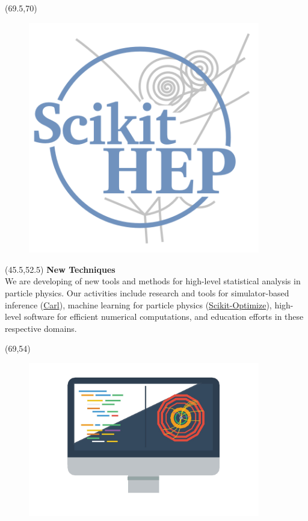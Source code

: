 \documentclass[final]{beamer}
\begin{document}
\begin{frame}{}
\begin{textblock}{12.0}(69.5,70)
\begin{figure}[tbph]
\centering
\includegraphics[width=0.9\textwidth]{images/scikit-hep-logo_800.png}
\end{figure}
\end{textblock}

\begin{textblock}{22.5}(45.5,52.5)
\textcolor{mybluelabel}{\bf New Techniques} \\
We are developing of new tools and methods for
high-level statistical analysis in particle physics. Our activities
include research and tools for simulator-based inference (\href{http://diana-hep.org/carl/}{Carl}), machine 
learning for particle physics (\href{https://scikit-optimize.github.io/}{Scikit-Optimize}), high-level software for efficient numerical
computations, and education efforts in these respective domains.
\end{textblock}

\begin{textblock}{12.5}(69,54)
\begin{figure}[tbph]
\centering
\includegraphics[width=0.9\textwidth]{images/better-software.jpg}
\end{figure}
\end{textblock}


\end{frame}
\end{document}
